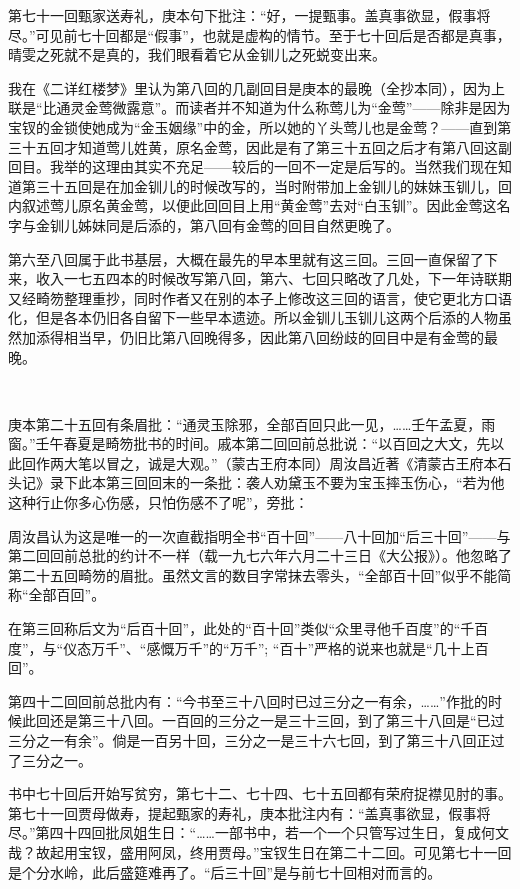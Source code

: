 \par 第七十一回甄家送寿礼，庚本句下批注：“好，一提甄事。盖真事欲显，假事将尽。”可见前七十回都是“假事”，也就是虚构的情节。至于七十回后是否都是真事，晴雯之死就不是真的，我们眼看着它从金钏儿之死蜕变出来。
\par 我在《二详红楼梦》里认为第八回的几副回目是庚本的最晚（全抄本同），因为上联是“比通灵金莺微露意”。而读者并不知道为什么称莺儿为“金莺”——除非是因为宝钗的金锁使她成为“金玉姻缘”中的金，所以她的丫头莺儿也是金莺？——直到第三十五回才知道莺儿姓黄，原名金莺，因此是有了第三十五回之后才有第八回这副回目。我举的这理由其实不充足——较后的一回不一定是后写的。当然我们现在知道第三十五回是在加金钏儿的时候改写的，当时附带加上金钏儿的妹妹玉钏儿，回内叙述莺儿原名黄金莺，以便此回回目上用“黄金莺”去对“白玉钏”。因此金莺这名字与金钏儿姊妹同是后添的，第八回有金莺的回目自然更晚了。
\par 第六至八回属于此书基层，大概在最先的早本里就有这三回。三回一直保留了下来，收入一七五四本的时候改写第八回，第六、七回只略改了几处，下一年诗联期又经畸笏整理重抄，同时作者又在别的本子上修改这三回的语言，使它更北方口语化，但是各本仍旧各自留下一些早本遗迹。所以金钏儿玉钏儿这两个后添的人物虽然加添得相当早，仍旧比第八回晚得多，因此第八回纷歧的回目中是有金莺的最晚。
\par  
\par 庚本第二十五回有条眉批：“通灵玉除邪，全部百回只此一见，……壬午孟夏，雨窗。”壬午春夏是畸笏批书的时间。戚本第二回回前总批说：“以百回之大文，先以此回作两大笔以冒之，诚是大观。”（蒙古王府本同）周汝昌近著《清蒙古王府本石头记》录下此本第三回回末的一条批：袭人劝黛玉不要为宝玉摔玉伤心，“若为他这种行止你多心伤感，只怕伤感不了呢”，旁批：
\par 周汝昌认为这是唯一的一次直截指明全书“百十回”——八十回加“后三十回”——与第二回回前总批的约计不一样（载一九七六年六月二十三日《大公报》）。他忽略了第二十五回畸笏的眉批。虽然文言的数目字常抹去零头，“全部百十回”似乎不能简称“全部百回”。
\par 在第三回称后文为“后百十回”，此处的“百十回”类似“众里寻他千百度”的“千百度”，与“仪态万千”、“感慨万千”的“万千”; “百十”严格的说来也就是“几十上百回”。
\par 第四十二回回前总批内有：“今书至三十八回时已过三分之一有余，……”作批的时候此回还是第三十八回。一百回的三分之一是三十三回，到了第三十八回是“已过三分之一有余”。倘是一百另十回，三分之一是三十六七回，到了第三十八回正过了三分之一。
\par 书中七十回后开始写贫穷，第七十二、七十四、七十五回都有荣府捉襟见肘的事。第七十一回贾母做寿，提起甄家的寿礼，庚本批注内有：“盖真事欲显，假事将尽。”第四十四回批凤姐生日：“……一部书中，若一个一个只管写过生日，复成何文哉？故起用宝钗，盛用阿凤，终用贾母。”宝钗生日在第二十二回。可见第七十一回是个分水岭，此后盛筵难再了。“后三十回”是与前七十回相对而言的。
